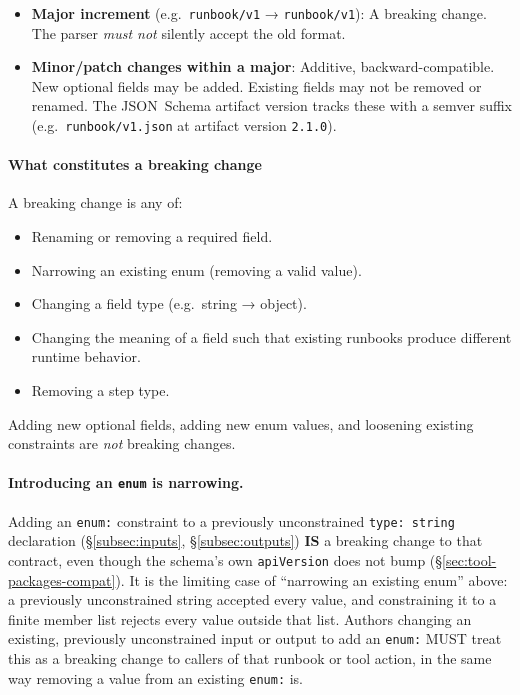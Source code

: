 \begin{itemize}
  \item \textbf{Major increment} (e.g.\ \texttt{runbook/v1} → \texttt{runbook/v1}):
        A breaking change.  The parser \emph{must not} silently accept the old
        format.
  \item \textbf{Minor/patch changes within a major}: Additive, backward-compatible.
        New optional fields may be added.  Existing fields may not be removed or
        renamed.  The JSON~Schema artifact version tracks these with a semver
        suffix (e.g.\ \texttt{runbook/v1.json} at artifact version
        \texttt{2.1.0}).
\end{itemize}

\paragraph{What constitutes a breaking change}

A breaking change is any of:
\begin{itemize}
  \item Renaming or removing a required field.
  \item Narrowing an existing enum (removing a valid value).
  \item Changing a field type (e.g.\ string → object).
  \item Changing the meaning of a field such that existing runbooks produce
        different runtime behavior.
  \item Removing a step type.
\end{itemize}

Adding new optional fields, adding new enum values, and loosening existing
constraints are \emph{not} breaking changes.

\paragraph{Introducing an \texttt{enum} is narrowing.} Adding an \texttt{enum:}
constraint to a previously unconstrained \texttt{type: string} declaration
(\S\ref{subsec:inputs}, \S\ref{subsec:outputs}) \textbf{IS} a breaking change
to that contract, even though the schema's own \texttt{apiVersion} does not
bump (\S\ref{sec:tool-packages-compat}). It is the limiting case of
``narrowing an existing enum'' above: a previously unconstrained string
accepted every value, and constraining it to a finite member list rejects
every value outside that list. Authors changing an existing, previously
unconstrained input or output to add an \texttt{enum:} MUST treat this as a
breaking change to callers of that runbook or tool action, in the same way
removing a value from an existing \texttt{enum:} is.



